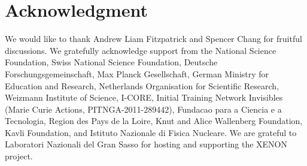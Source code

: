 \section{Acknowledgment}
We would like to thank Andrew Liam Fitzpatrick and Spencer Chang for fruitful discussions. We gratefully acknowledge support from the National Science Foundation, Swiss National Science Foundation, Deutsche Forschungsgemeinschaft, Max Planck Gesellschaft, German Ministry for Education and Research, Netherlands Organisation for Scientific Research, Weizmann Institute of Science, I-CORE, Initial Training Network Invisibles (Marie Curie Actions, PITNGA-2011-289442), Fundacao para a Ciencia e a Tecnologia, Region des Pays de la Loire, Knut and Alice Wallenberg Foundation, Kavli Foundation, and Istituto Nazionale di Fisica Nucleare. We are grateful to Laboratori Nazionali del Gran Sasso for hosting and supporting the XENON project.



